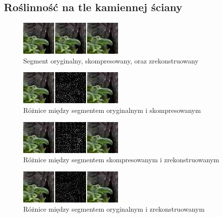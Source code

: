\documentclass[a4paper, 12pt]{article}
\begin{document}
\subsection{Roślinność na tle kamiennej ściany}
\begin{figure}[h!]
\begin{center}
	\includegraphics[width=0.85\columnwidth]{compare_sample.png}
	\caption{Segment oryginalny, skompresowany, oraz zrekonstruowany}
\end{center}
\end{figure}
\begin{figure}[h!]
\begin{center}
	\includegraphics[width=0.85\columnwidth]{orig_vs_comp.png}
	\caption{Różnice między segmentem oryginalnym i skompresowanym}
\end{center}
\end{figure}
\begin{figure}[h!]
\begin{center}
	\includegraphics[width=0.85\columnwidth]{comp_vs_rest.png}
	\caption{Różnice między segmentem skompresowanym i zrekonstruowanym}
\end{center}
\end{figure}
\begin{figure}[h!]
\begin{center}
	\includegraphics[width=0.85\columnwidth]{orig_vs_rest.png}
	\caption{Różnice między segmentem oryginalnym i zrekonstruowanym}
\end{center}
\end{figure}
\end{document}
